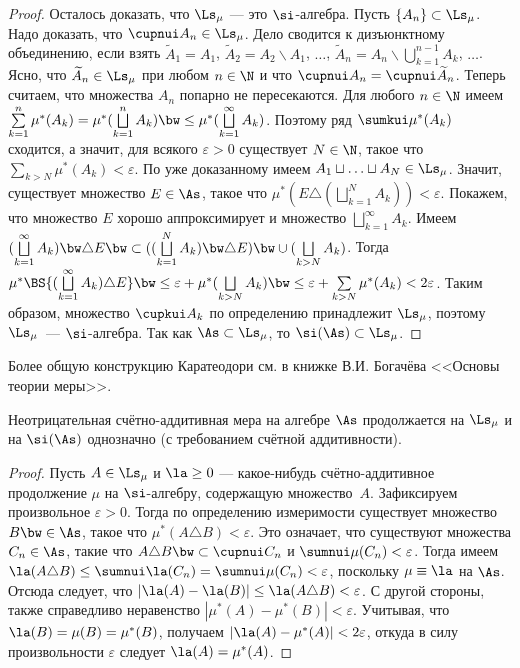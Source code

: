 \documentclass[10pt]{article}
\newcommand{\ve}{\varepsilon}
\begin{document}
\begin{proof}
Осталось доказать, что $\Ls_{\mu}$ --- это $\si$-алгебра. Пусть
$\{A_n\}\subset\Ls_{\mu}$. Надо доказать, что $\cupnui
A_n\in\Ls_{\mu}$. Дело сводится к дизъюнктному объединению, если
взять $\widetilde A_1=A_1$, $\widetilde A_2=A_2\backslash A_1$,
$\ldots$, $\widetilde A_n=A_n\backslash\bigcup
\limits_{k=1}^{n-1}A_k$, $\ldots$. Ясно, что $\widetilde
A_n\in\Ls_{\mu}$ при любом $n\in\N$ и что $\cupnui
A_n=\cupnui\widetilde A_n$. Теперь считаем, что множества $A_n$
попарно не пересекаются. Для любого $n\in\N$ имеем
$\sum\limits_{k=1}^n\mu^*(A_k)=\mu^*(\bigsqcup\limits_{k=1}^nA_k)\bw
\le\mu^*(\bigsqcup\limits_{k=1}^\infty A_k)$. Поэтому ряд
$\sumkui\mu^*(A_k)$ сходится, а значит, для всякого $\ve>0$
существует $N\in\N$, такое что $\sum\limits_{k>N}\mu^*(A_k)<\ve$. По
уже доказанному имеем $A_1\sqcup\ldots\sqcup A_N\in\Ls_{\mu}$.
Значит, существует множество $E\in\As$, такое что
$\mu^*(E\triangle(\bigsqcup\limits_{k=1}^N A_k))<\ve$. Покажем, что
множество $E$ хорошо аппроксимирует и множество
$\bigsqcup\limits_{k=1}^\infty A_k$. Имеем
$(\bigsqcup\limits_{k=1}^\infty A_k)\bw \triangle E \bw
\subset((\bigsqcup\limits_{k=1}^N A_k) \bw \triangle E)\bw
\cup(\bigsqcup\limits_{k>N}A_k)$. Тогда
$\mu^*\BS{(\bigsqcup\limits_{k=1}^\infty A_k) \triangle E} \bw \le
\ve+\mu^*(\bigsqcup\limits_{k>N}A_k)
\bw\le\ve+\sum\limits_{k>N}\mu^*(A_k)< 2\ve$. Таким образом,
множество $\cupkui A_k$ по определению принадлежит $\Ls_{\mu}$,
поэтому $\Ls_\mu$~--- $\si$-алгебра. Так как $\As\subset\Ls_\mu$, то
$\si(\As)\subset \Ls_\mu$.
\end{proof}

\begin{note}
Более общую конструкцию Каратеодори см. в книжке В.И. Богачёва
<<Основы теории меры>>.
\end{note}

\begin{imp}
Неотрицательная счётно-аддитивная мера на алгебре $\As$ продолжается
на $\Ls_{\mu}$ и на $\si(\As)$ однозначно (с требованием счётной
аддитивности).
\end{imp}

\begin{proof}
Пусть $A\in\Ls_{\mu}$ и $\la\ge0$ --- какое-нибудь счётно-аддитивное
продолжение $\mu$ на $\si$-алгебру, содержащую множество~$A$.
Зафиксируем произвольное $\ve>0$. Тогда по определению измеримости
существует множество $B\bw\in\As$, такое что $\mu^*(A\triangle
B)<\ve$. Это означает, что существуют множества $C_n\in\As$, такие
что $A\triangle B\bw \subset\cupnui C_n$ и $\sumnui\mu(C_n)<\ve$.
Тогда имеем $\la(A\triangle
B)\le\sumnui\la(C_n)=\sumnui\mu(C_n)<\ve$, поскольку $\mu\equiv\la$
на $\As$. Отсюда следует, что $|\la(A)-\la(B)|\le\la(A\triangle
B)<\ve$. С другой стороны, также справедливо неравенство
$|\mu^*(A)-\mu^*(B)|<\ve$. Учитывая, что $\la(B)=\mu(B)=\mu^*(B)$,
получаем $|\la(A)-\mu^*(A)|<2\ve$, откуда в силу произвольности
$\ve$ следует $\la(A)=\mu^*(A)$.
\end{proof}
\end{document}
